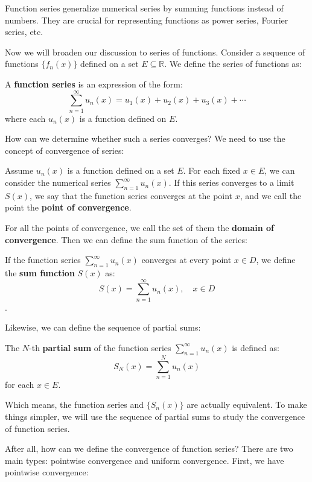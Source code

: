 Function series generalize numerical series by summing functions instead of numbers. They are crucial for representing functions as power series, Fourier series, etc.

Now we will broaden our discussion to series of functions. Consider a sequence of functions $\{f_n(x)\}$ defined on a set $E \subseteq \mathbb{R}$. We define the series of functions as:

\begin{definition}
A \textbf{function series} is an expression of the form:
\[ \sum_{n=1}^{\infty} u_n(x) = u_1(x) + u_2(x) + u_3(x) + \cdots \]
where each $u_n(x)$ is a function defined on $E$.
\end{definition}

How can we determine whether such a series converges? We need to use the concept of convergence of series:

\begin{definition}
    Assume $u_n(x)$ is a function defined on a set $E$. For each fixed $x \in E$, we can consider the numerical series $\sum_{n=1}^{\infty} u_n(x)$. If this series converges to a limit $S(x)$, we say that the function series converges at the point $x$, and we call the point the \textbf{point of convergence}.
\end{definition}

For all the points of convergence, we call the set of them the \textbf{domain of convergence}. Then we can define the sum function of the series:

\begin{definition}
If the function series $\sum_{n=1}^{\infty} u_n(x)$ converges at every point $x \in D$, we define the \textbf{sum function} $S(x)$ as:
\[ S(x) = \sum_{n=1}^{\infty} u_n(x), \quad x \in D \].
\end{definition}

Likewise, we can define the sequence of partial sums:

\begin{definition}
The $N$-th \textbf{partial sum} of the function series $\sum_{n=1}^{\infty} u_n(x)$ is defined as:
\[ S_N(x) = \sum_{n=1}^{N} u_n(x) \]
for each $x \in E$.
\end{definition}

Which means, the function series and $\{S_n(x)\}$ are actually equivalent. To make things simpler, we will use the sequence of partial sums to study the convergence of function series.

After all, how can we define the convergence of function series? There are two main types: pointwise convergence and uniform convergence. First, we have pointwise convergence:

